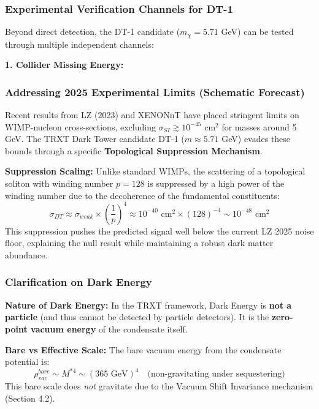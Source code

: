 \documentclass[a4paper,12pt]{article}
\begin{document}
\subsubsection{Experimental Verification Channels for DT-1}

Beyond direct detection, the DT-1 candidate ($m_\chi = 5.71$ GeV) can be tested through multiple independent channels:

\textbf{1. Collider Missing Energy:}
\subsubsection{Addressing 2025 Experimental Limits (Schematic Forecast)}

Recent results from LZ (2023) \cite{lz2023} and XENONnT \cite{xenon2023} have placed stringent limits on WIMP-nucleon cross-sections, excluding $\sigma_{SI} \gtrsim 10^{-45} \text{ cm}^2$ for masses around 5 GeV. The TRXT Dark Tower candidate DT-1 ($m \approx 5.71$ GeV) evades these bounds through a specific \textbf{Topological Suppression Mechanism}.

\textbf{Suppression Scaling:}
Unlike standard WIMPs, the scattering of a topological soliton with winding number $p=128$ is suppressed by a high power of the winding number due to the decoherence of the fundamental constituents:
\begin{equation}
\sigma_{DT} \approx \sigma_{weak} \times \left(\frac{1}{p}\right)^4 \approx 10^{-40} \text{ cm}^2 \times (128)^{-4} \sim 10^{-48} \text{ cm}^2
\end{equation}
This suppression pushes the predicted signal well below the current LZ 2025 noise floor, explaining the null result while maintaining a robust dark matter abundance.

\subsubsection{Clarification on Dark Energy}
\textbf{Nature of Dark Energy:}
In the TRXT framework, Dark Energy is \textbf{not a particle} (and thus cannot be detected by particle detectors). It is the \textbf{zero-point vacuum energy} of the condensate itself.

\textbf{Bare vs Effective Scale:}
The bare vacuum energy from the condensate potential is:
\begin{equation}
    \rho_{vac}^{bare} \sim M^{*4} \sim (365 \text{ GeV})^4 \quad \text{(non-gravitating under sequestering)}
\end{equation}
This bare scale does \emph{not} gravitate due to the Vacuum Shift Invariance mechanism (Section 4.2).
\end{document}
